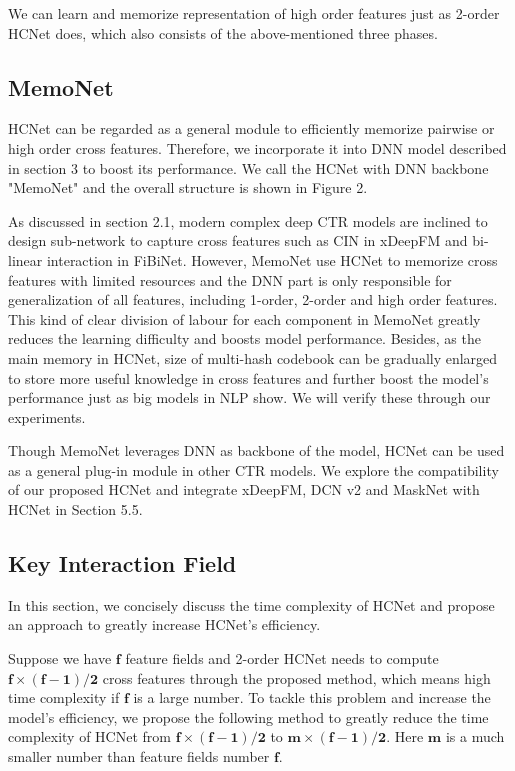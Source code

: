 \documentclass[sigconf,authorversion]{acmart}
\begin{document}
 
We can learn and memorize representation of high order features just as 2-order HCNet does, which also consists of the above-mentioned three phases. 


\subsection{MemoNet}
HCNet can be regarded as a general module to efficiently memorize pairwise or high order cross features. Therefore, we incorporate it into DNN model described in section 3 to boost its performance. We call the HCNet with DNN backbone "MemoNet" and the overall structure is shown in Figure 2.

As discussed in section 2.1, modern complex deep CTR models are inclined to design sub-network to capture cross features such as CIN in xDeepFM\cite{lian2018xdeepfm} and bi-linear interaction in FiBiNet\cite{HuangZZ19}. However, MemoNet use HCNet to memorize cross features with limited resources and the DNN part is only responsible for generalization of all features, including 1-order, 2-order and high order features. This kind of clear division of labour for each component in MemoNet greatly reduces the learning difficulty and boosts model performance. Besides, as the main memory in HCNet, size of multi-hash codebook can be gradually enlarged to store more useful knowledge in cross features and further boost the model's performance just as big models in NLP show. We will verify these through our experiments.

Though MemoNet leverages DNN as backbone of the model, HCNet can be used as a general plug-in module in other CTR models. We explore the compatibility of our proposed HCNet and integrate xDeepFM, DCN v2 and MaskNet with HCNet in Section 5.5.  

\subsection{Key Interaction Field}
In this section, we concisely discuss the time complexity of HCNet and propose an approach to greatly increase HCNet's efficiency.

Suppose we have $\mathbf{f}$ feature fields and 2-order HCNet needs to compute $\mathbf{f \times (f-1)/2}$ cross features through the proposed method, which means high time complexity if $\mathbf{f}$ is a large number. To tackle this problem and increase the model's efficiency, we propose the following method to greatly reduce the time complexity of HCNet from $\mathbf{f \times (f-1)/2}$ to $\mathbf{m \times (f-1)/2}$. Here  $\mathbf{m}$ is a much smaller number than feature fields number $\mathbf{f}$.  
\end{document}
